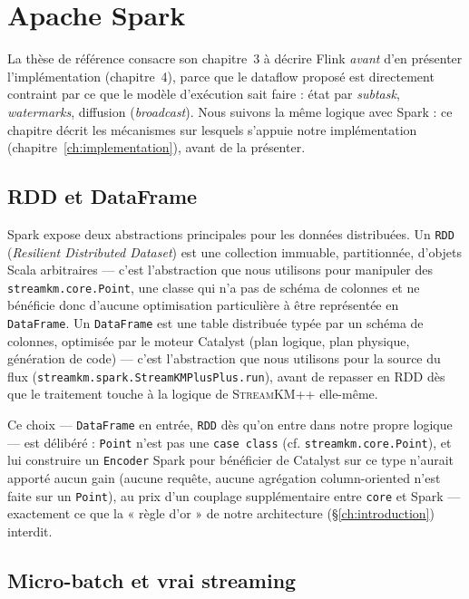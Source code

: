 \chapter{Apache Spark}
\label{ch:spark}

La thèse de référence consacre son chapitre~3 à décrire Flink \emph{avant}
d'en présenter l'implémentation (chapitre~4), parce que le dataflow proposé
est directement contraint par ce que le modèle d'exécution sait faire : état
par \emph{subtask}, \emph{watermarks}, diffusion (\emph{broadcast}). Nous
suivons la même logique avec Spark : ce chapitre décrit les mécanismes sur
lesquels s'appuie notre implémentation (chapitre~\ref{ch:implementation}),
avant de la présenter.

\section{RDD et DataFrame}

Spark expose deux abstractions principales pour les données distribuées.
Un \texttt{RDD} (\emph{Resilient Distributed Dataset}) est une collection
immuable, partitionnée, d'objets Scala arbitraires --- c'est l'abstraction
que nous utilisons pour manipuler des \texttt{streamkm.core.Point}, une
classe qui n'a pas de schéma de colonnes et ne bénéficie donc d'aucune
optimisation particulière à être représentée en \texttt{DataFrame}. Un
\texttt{DataFrame} est une table distribuée typée par un schéma de colonnes,
optimisée par le moteur Catalyst (plan logique, plan physique, génération de
code) --- c'est l'abstraction que nous utilisons pour la source du flux
(\texttt{streamkm.spark.StreamKMPlusPlus.run}), avant de repasser en RDD dès
que le traitement touche à la logique de \textsc{StreamKM++} elle-même.

Ce choix --- \texttt{DataFrame} en entrée, \texttt{RDD} dès qu'on entre dans
notre propre logique --- est délibéré : \texttt{Point} n'est pas une
\texttt{case class} (cf. \texttt{streamkm.core.Point}), et lui construire un
\texttt{Encoder} Spark pour bénéficier de Catalyst sur ce type n'aurait
apporté aucun gain (aucune requête, aucune agrégation column-oriented n'est
faite sur un \texttt{Point}), au prix d'un couplage supplémentaire entre
\texttt{core} et Spark --- exactement ce que la « règle d'or » de notre
architecture (§\ref{ch:introduction}) interdit.

\section{Micro-batch et vrai streaming}

